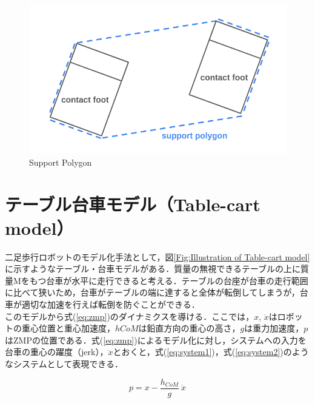 \begin{figure}[H]
     \centering
    \includegraphics[keepaspectratio, scale=0.4]
         {images/walk/support_polygon.png}
    \caption{Support Polygon}
    \label{Fig:Support Polygon}
\end{figure}

\section{テーブル台車モデル（Table-cart model）}
二足歩行ロボットのモデル化手法として，図\ref{Fig:Illustration of Table-cart model}に示すようなテーブル・台車モデルがある．質量の無視できるテーブルの上に質量Mをもつ台車が水平に走行できると考える．テーブルの台座が台車の走行範囲に比べて狭いため，台車がテーブルの端に達すると全体が転倒してしまうが，台車が適切な加速を行えば転倒を防ぐことができる．\\
このモデルから式(\ref{eq:zmp})のダイナミクスを導ける．ここでは，$x$, $\ddot{x}$はロボットの重心位置と重心加速度，$hCoM$は鉛直方向の重心の高さ，$g$は重力加速度，$p$はZMPの位置である．式(\ref{eq:zmp})によるモデル化に対し，システムへの入力を台車の重心の躍度（jerk），$\dddot{x}$とおくと，式(\ref{eq:system1})，式(\ref{eq:system2})のようなシステムとして表現できる．


\begin{equation}
     p=x-\frac{h_{CoM}}{g}\ \ddot{x}
     \label{eq:zmp}
\end{equation}

